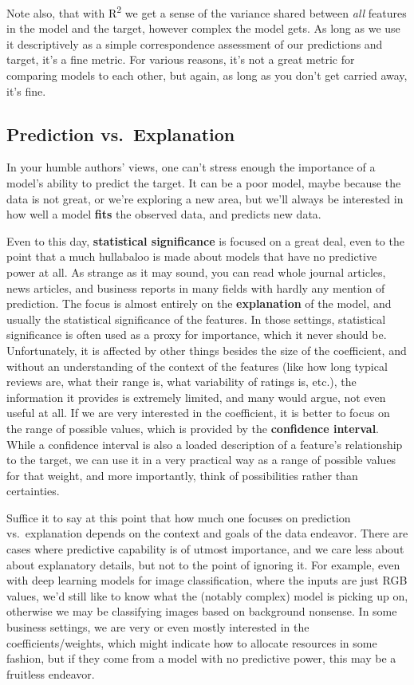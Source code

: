 \documentclass[
  letterpaper,
]{krantz}
\begin{document}
Note also, that with R\textsuperscript{2} we get a sense of the variance
shared between \emph{all} features in the model and the target, however
complex the model gets. As long as we use it descriptively as a simple
correspondence assessment of our predictions and target, it's a fine
metric. For various reasons, it's not a great metric for comparing
models to each other, but again, as long as you don't get carried away,
it's fine.

\subsection{Prediction
vs.~Explanation}\label{prediction-vs.-explanation}

In your humble authors' views, one can't stress enough the importance of
a model's ability to predict the target. It can be a poor model, maybe
because the data is not great, or we're exploring a new area, but we'll
always be interested in how well a model \textbf{fits} the observed
data, and predicts new data.

Even to this day, \textbf{statistical significance} is focused on a
great deal, even to the point that a much hullabaloo is made about
models that have no predictive power at all. As strange as it may sound,
you can read whole journal articles, news articles, and business reports
in many fields with hardly any mention of prediction. The focus is
almost entirely on the \textbf{explanation} of the model, and usually
the statistical significance of the features. In those settings,
statistical significance is often used as a proxy for importance, which
it never should be. Unfortunately, it is affected by other things
besides the size of the coefficient, and without an understanding of the
context of the features (like how long typical reviews are, what their
range is, what variability of ratings is, etc.), the information it
provides is extremely limited, and many would argue, not even useful at
all. If we are very interested in the coefficient, it is better to focus
on the range of possible values, which is provided by the
\textbf{confidence interval}. While a confidence interval is also a
loaded description of a feature's relationship to the target, we can use
it in a very practical way as a range of possible values for that
weight, and more importantly, think of possibilities rather than
certainties.

Suffice it to say at this point that how much one focuses on prediction
vs.~explanation depends on the context and goals of the data endeavor.
There are cases where predictive capability is of utmost importance, and
we care less about about explanatory details, but not to the point of
ignoring it. For example, even with deep learning models for image
classification, where the inputs are just RGB values, we'd still like to
know what the (notably complex) model is picking up on, otherwise we may
be classifying images based on background nonsense. In some business
settings, we are very or even mostly interested in the
coefficients/weights, which might indicate how to allocate resources in
some fashion, but if they come from a model with no predictive power,
this may be a fruitless endeavor.
\end{document}
